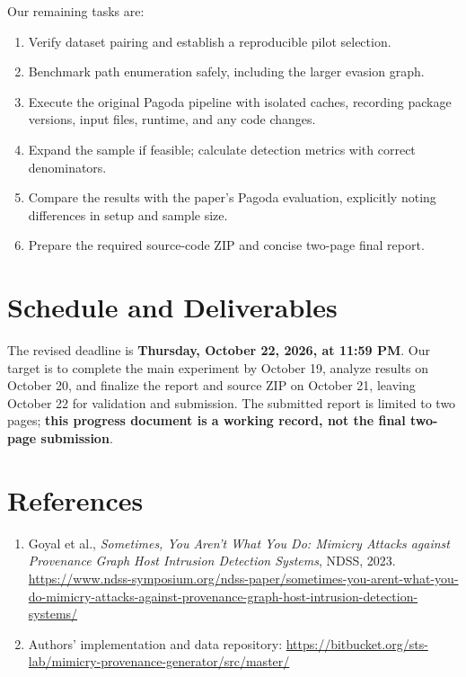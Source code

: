 \documentclass[11pt,letterpaper]{article}
\begin{document}
Our remaining tasks are:
\begin{enumerate}[leftmargin=*]
\item Verify dataset pairing and establish a reproducible pilot selection.
\item Benchmark path enumeration safely, including the larger evasion graph.
\item Execute the original Pagoda pipeline with isolated caches, recording package versions, input files, runtime, and any code changes.
\item Expand the sample if feasible; calculate detection metrics with correct denominators.
\item Compare the results with the paper's Pagoda evaluation, explicitly noting differences in setup and sample size.
\item Prepare the required source-code ZIP and concise two-page final report.
\end{enumerate}

\section{Schedule and Deliverables}
The revised deadline is \textbf{Thursday, October 22, 2026, at 11:59 PM}. Our target is to complete the main experiment by October 19, analyze results on October 20, and finalize the report and source ZIP on October 21, leaving October 22 for validation and submission. The submitted report is limited to two pages; \textbf{this progress document is a working record, not the final two-page submission}.

\section{References}
\begin{enumerate}[leftmargin=*]
\item Goyal et al., \emph{Sometimes, You Aren't What You Do: Mimicry Attacks against Provenance Graph Host Intrusion Detection Systems}, NDSS, 2023. \url{https://www.ndss-symposium.org/ndss-paper/sometimes-you-arent-what-you-do-mimicry-attacks-against-provenance-graph-host-intrusion-detection-systems/}
\item Authors' implementation and data repository: \url{https://bitbucket.org/sts-lab/mimicry-provenance-generator/src/master/}
\end{enumerate}
\end{document}
